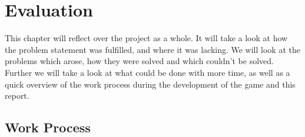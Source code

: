 \chapter{Evaluation}
This chapter will reflect over the project as a whole. It will take a look at how the problem statement was fulfilled, and where it was lacking. We will look at the problems which arose, how they were solved and which couldn't be solved. Further we will take a look at what could be done with more time, as well as a quick overview of the work process during the development of the game and this report.

\section{Work Process}

